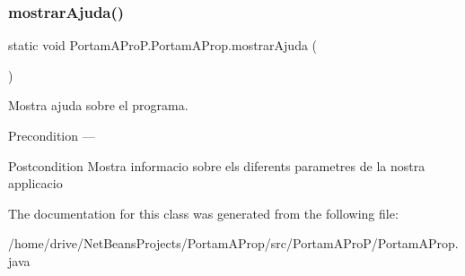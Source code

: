 \subsubsection{\texorpdfstring{mostrar\+Ajuda()}{mostrarAjuda()}}
{\footnotesize\ttfamily static void Portam\+A\+Pro\+P.\+Portam\+A\+Prop.\+mostrar\+Ajuda (\begin{DoxyParamCaption}{ }\end{DoxyParamCaption})\hspace{0.3cm}{\ttfamily [static]}}



Mostra ajuda sobre el programa. 

\begin{DoxyPrecond}{Precondition}
--- 
\end{DoxyPrecond}
\begin{DoxyPostcond}{Postcondition}
Mostra informacio sobre els diferents parametres de la nostra applicacio 
\end{DoxyPostcond}


The documentation for this class was generated from the following file\+:\begin{DoxyCompactItemize}
\item 
/home/drive/\+Net\+Beans\+Projects/\+Portam\+A\+Prop/src/\+Portam\+A\+Pro\+P/Portam\+A\+Prop.\+java\end{DoxyCompactItemize}
